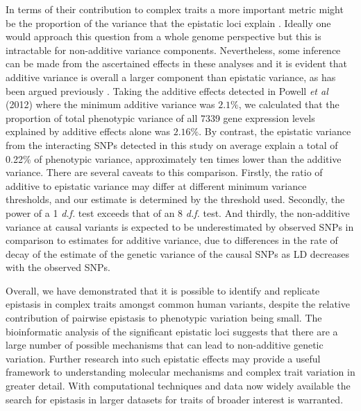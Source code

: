 \documentclass{article}
\begin{document}
In terms of their contribution to complex traits a more important metric might be the proportion of the variance that the epistatic loci explain \cite{Hill2008a}. Ideally one would approach this question from a whole genome perspective \cite{Visscher2008} but this is intractable for non-additive variance components. Nevertheless, some inference can be made from the ascertained effects in these analyses and it is evident that additive variance is overall a larger component than epistatic variance, as has been argued previously \cite{Hill2008a, Crow2010}. Taking the additive effects detected in Powell \emph{et al} (2012) where the minimum additive variance was $2.1\%$, we calculated that the proportion of total phenotypic variance of all 7339 gene expression levels explained by additive effects alone was $2.16\%$. By contrast, the epistatic variance from the interacting SNPs detected in this study on average explain a total of 0.22\% of phenotypic variance, approximately ten times lower than the additive variance. There are several caveats to this comparison. Firstly, the ratio of additive to epistatic variance may differ at different minimum variance thresholds, and our estimate is determined by the threshold used. Secondly, the power of a 1 \emph{d.f.} test exceeds that of an 8 \emph{d.f.} test. And thirdly, the non-additive variance at causal variants is expected to be underestimated by observed SNPs in comparison to estimates for additive variance, due to differences in the rate of decay of the estimate of the genetic variance of the causal SNPs as LD decreases with the observed SNPs.


Overall, we have demonstrated that it is possible to identify and replicate epistasis in complex traits amongst common human variants, despite the relative contribution of pairwise epistasis to phenotypic variation being small. The bioinformatic analysis of the significant epistatic loci suggests that there are a large number of possible mechanisms that can lead to non-additive genetic variation. Further research into such epistatic effects may provide a useful framework to understanding molecular mechanisms and complex trait variation in greater detail. With computational techniques and data now widely available the search for epistasis in larger datasets for traits of broader interest is warranted.
\end{document}
